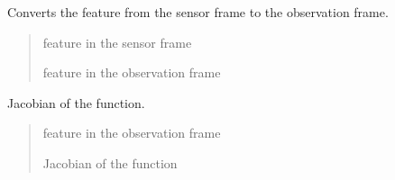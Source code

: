 \documentclass[letterpaper,10pt,english]{sphinxmanual}
\begin{document}
\begin{fulllineitems}
\begin{fulllineitems}
\label{\detokenize{FEKFMBLocalization:MapFeature.Cartesian2DStoredPolarObservedMapFeature.s2o}}
\pysigstartsignatures
{}
\pysigstopsignatures
\sphinxAtStartPar
Converts the feature from the sensor frame to the observation frame.
\begin{quote}\begin{description}
\sphinxAtStartPar
{} \textendash{} feature in the sensor frame

\sphinxAtStartPar
feature in the observation frame

\end{description}\end{quote}

\end{fulllineitems}


\begin{fulllineitems}
\label{\detokenize{FEKFMBLocalization:MapFeature.Cartesian2DStoredPolarObservedMapFeature.J_o2s}}
\pysigstartsignatures
{}
\pysigstopsignatures
\sphinxAtStartPar
Jacobian of the {\hyperref[\detokenize{FEKFMBLocalization:MapFeature.Cartesian2DStoredPolarObservedMapFeature.o2s}]{}} function.
\begin{quote}\begin{description}
\sphinxAtStartPar
{} \textendash{} feature in the observation frame

\sphinxAtStartPar
Jacobian of the {\hyperref[\detokenize{FEKFMBLocalization:MapFeature.Cartesian2DStoredPolarObservedMapFeature.o2s}]{}} function

\end{description}\end{quote}

\end{fulllineitems}



\end{fulllineitems}
\end{document}
